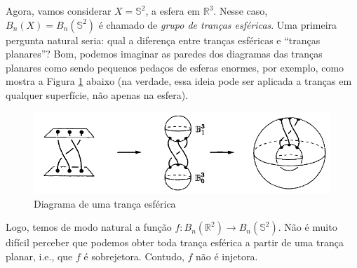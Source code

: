 	\par\vspace{0.3cm} Agora, vamos considerar $X = \mathbb{S}^2$, a esfera em 
	$\mathbb{R}^3$. Nesse caso, $B_n(X) = B_n(\mathbb{S}^2)$ é chamado de 
	\textit{grupo de tranças esféricas}. Uma primeira pergunta natural seria: qual a 
	diferença entre tranças esféricas e ``tranças planares''? Bom, podemos imaginar as 
	paredes dos diagramas das tranças planares como sendo pequenos pedaços de esferas enormes, 
	por exemplo, como mostra a Figura \ref{diagrama tranca esferica} 
	abaixo (na verdade, essa ideia pode ser aplicada a tranças em qualquer superfície, não apenas na esfera).
	\begin{figure}[H]
		\begin{center}
			\includegraphics[width=12cm]{Images/diagrama_tranca_esferica.png}
		\end{center}\caption{Diagrama de uma trança esférica}
		\label{diagrama tranca esferica}
	\end{figure}
	Logo, temos de modo natural a função $f: B_n(\mathbb{R}^2)\to B_n(\mathbb{S}^2)$. 
	Não é muito difícil perceber que podemos obter toda trança esférica a partir de 
	uma trança planar, i.e., que $f$ é sobrejetora. Contudo, $f$ não é injetora.
	
